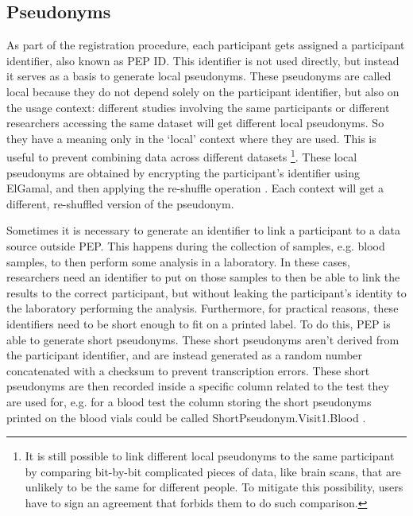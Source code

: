 \documentclass{report}
\begin{document}
\subsection{Pseudonyms}\label{pseudonyms}
As part of the registration procedure, each participant gets assigned a participant identifier, also known as PEP ID. This identifier is not used directly, but instead it serves as a 
basis to generate local pseudonyms. These pseudonyms are called local because they do not depend solely on the participant identifier, but also on the usage context: different studies 
involving the same participants or different researchers accessing the same dataset will get different local pseudonyms. So they have a meaning only in the \enquote*{local} context 
where they are used. This is useful to prevent combining data across different datasets \footnote{It is still possible to link different local pseudonyms to the same participant by 
comparing bit-by-bit complicated pieces of data, like brain scans, that are unlikely to be the same for different people. To mitigate this possibility, users have to sign an agreement 
that forbids them to do such comparison.}. These local pseudonyms are obtained by encrypting the participant's identifier using ElGamal, and then applying the re-shuffle operation
\cite{pep-blueprint}. Each context will get a different, re-shuffled version of the pseudonym.\par
Sometimes it is necessary to generate an identifier to link a participant to a data source outside PEP. This happens during the collection of samples, e.g. blood samples, to then
perform some analysis in a laboratory. In these cases, researchers need an identifier to put on those samples to then be able to link the results to the correct participant, but
without leaking the participant's identity to the laboratory performing the analysis. Furthermore, for practical reasons, these identifiers need to be short enough to fit on a printed label. To do this, PEP is able to generate short
pseudonyms. These short pseudonyms aren't derived from the participant identifier, and are instead generated as a random number concatenated with a checksum to prevent
transcription errors. These short pseudonyms are then recorded inside a specific column related to the test they are used for, e.g. for a blood test the column storing the short
pseudonyms printed on the blood vials could be called ShortPseudonym.Visit1.Blood  \cite{pep-blueprint}.
\end{document}
